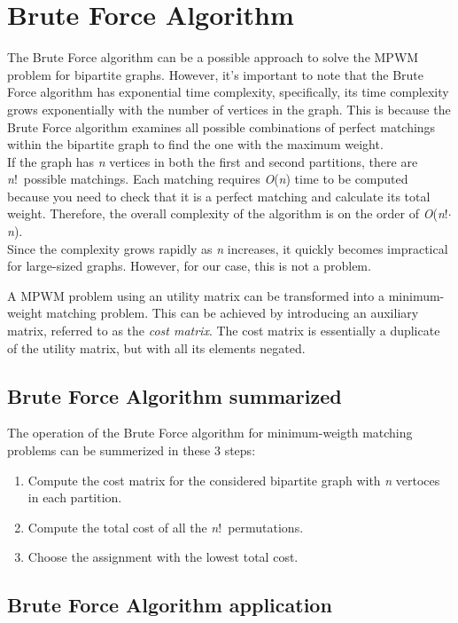 \section{Brute Force Algorithm}
The Brute Force algorithm can be a possible approach to solve the MPWM problem for bipartite graphs.
However, it's important to note that the Brute Force algorithm has exponential time complexity, specifically, its time complexity grows exponentially with the number of vertices in the graph.
This is because the Brute Force algorithm examines all possible combinations of perfect matchings within the bipartite graph to find the one with the maximum weight.\\
If the graph has \textit{n} vertices in both the first and second partitions, there are \textit{n}!\ possible matchings.
Each matching requires \textit{O}(\textit{n}) time to be computed because you need to check that it is a perfect matching and calculate its total weight.
Therefore, the overall complexity of the algorithm is on the order of \textit{O}(\textit{n}!$\cdot$\textit{n}). \\
Since the complexity grows rapidly as \textit{n} increases, it quickly becomes impractical for large-sized graphs. However, for our case, this is not a problem.

A MPWM problem using an utility matrix can be transformed into a minimum-weight matching problem.
This can be achieved by introducing an auxiliary matrix, referred to as the \textit{cost matrix}.
The cost matrix is essentially a duplicate of the utility matrix, but with all its elements negated.

\subsection{Brute Force Algorithm summarized}
The operation of the Brute Force algorithm for minimum-weigth matching problems can be summerized in these 3 steps:

\begin{enumerate}
    \item {Compute the cost matrix for the considered bipartite graph with \textit{n} vertoces in each partition.}
    \item {Compute the total cost of all the \textit{n}!\ permutations.}
    \item {Choose the assignment with the lowest total cost.}
\end{enumerate}


\subsection{Brute Force Algorithm application}

